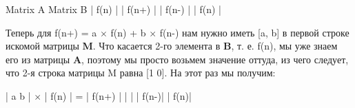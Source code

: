 \vspace{\baselineskip}
\begin{tcolorbox}
\hspace{3,5mm} Matrix A \hspace{20mm}Matrix B \newline
\hspace*{3mm}|\hspace{5mm}  f(n)  \hspace*{5mm}|  \hspace*{13mm} |\hspace*{2mm} f(n+)\hspace*{2mm} |\newline
\hspace*{3mm}|\hspace*{3mm} f(n-)\hspace*{3,5mm} |  \hspace*{13mm} |\hspace*{4mm}  f(n) \hspace{4mm}  |
\end{tcolorbox}

\vspace{\baselineskip}
Теперь для f(n+) = a $\times$ f(n) + b $\times$ f(n-) нам нужно иметь [a, b] в первой строке искомой матрицы \textbf{M}. Что касается 2-го элемента в \textbf{B}, т. е. f(n), мы уже знаем его из матрицы \textbf{A}, поэтому мы просто возьмем значение оттуда, из чего следует, что 2-я строка матрицы M равна [1 0]. На этот раз мы получим:

\vspace{\baselineskip}
\begin{tcolorbox}
|\hspace{1,5mm} a \hspace{3mm}  b \hspace{0,1mm}|\hspace{3mm} $\times$ \hspace{3mm}| \hspace{3mm} f(n) \hspace{3mm}|\hspace{3mm}  = \hspace{3mm} |\hspace*{2,5mm} f(n+)\hspace*{2,9mm} |\newline
|\hspace{1,5mm} \hspace{6mm}\hspace{0,1mm} |\hspace*{10,7mm}     |\hspace*{2,5mm} f(n-)\hspace*{2,9mm}| \hspace*{10,5mm}    |\hspace*{6mm} f(n)\hspace*{6mm}|
\end{tcolorbox}


